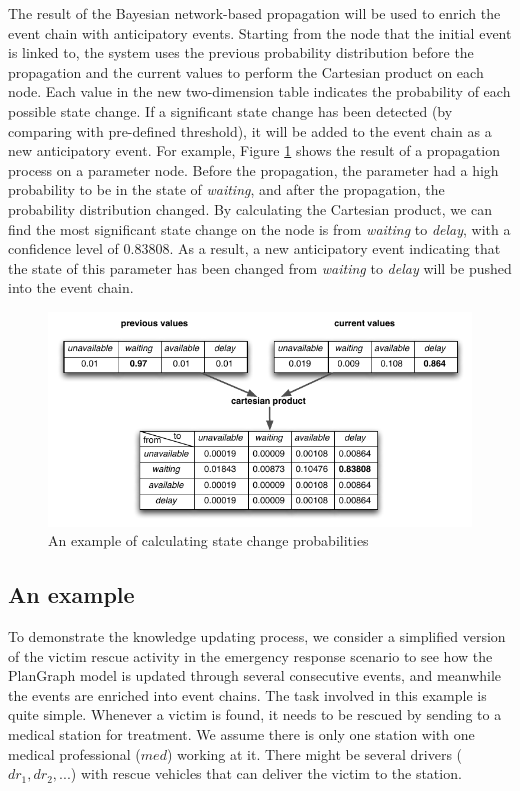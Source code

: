 The result of the Bayesian network-based propagation will be used to enrich the event chain with anticipatory events. Starting from the node that the initial event is linked to, the system uses the previous probability distribution before the propagation and the current values to perform the Cartesian product on each node. Each value in the new two-dimension table indicates the probability of each possible state change. If a significant state change has been detected (by comparing with pre-defined threshold), it will be added to the event chain as a new anticipatory event. For example, Figure \ref{fig:prob_state_change} shows the result of a propagation process on a parameter node. Before the propagation, the parameter had a high probability to be in the state of \emph{waiting}, and after the propagation, the probability distribution changed. By calculating the Cartesian product, we can find the most significant state change on the node is from \emph{waiting} to \emph{delay}, with a confidence level of $0.83808$. As a result, a new anticipatory event indicating that the state of this parameter has been changed from \emph{waiting} to \emph{delay} will be pushed into the event chain.
\begin{figure}[htbp] %
	\centering
	\includegraphics{prob_state_change.pdf} 
	\caption{An example of calculating state change probabilities}
	\label{fig:prob_state_change}
\end{figure}
\subsection{An example} %
\label{sub:an_example}
To demonstrate the knowledge updating process, we consider a simplified version of the victim rescue activity in the emergency response scenario to see how the PlanGraph model is updated through several consecutive events, and meanwhile the events are enriched into event chains. The task involved in this example is quite simple. Whenever a victim is found, it needs to be rescued by sending to a medical station for treatment. We assume there is only one station with one medical professional ($med$) working at it. There might be several drivers ($dr_1, dr_2, ...$) with rescue vehicles that can deliver the victim to the station.   

